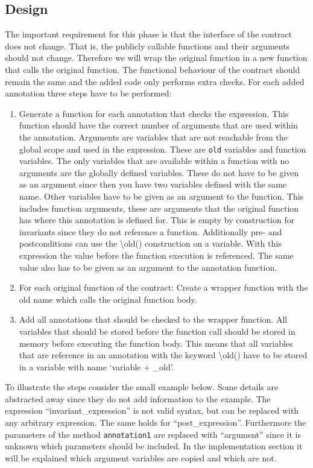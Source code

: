\documentclass[a4paper]{article}
\begin{document}
\subsection{Design}
The important requirement for this phase is that the interface of the contract does not change. That is, the publicly callable functions and their arguments should not change. Therefore we will wrap the original function in a new function that calls the original function. The functional behaviour of the contract should remain the same and the added code only performs extra checks. For each added annotation three steps have to be performed:
\begin{enumerate}
  \item Generate a function for each annotation that checks the expression. This function should have the correct number of arguments that are used within the annotation. Arguments are variables that are not reachable from the global scope and used in the expression. These are \texttt{old} variables and function variables. The only variables that are available within a function with no arguments are the globally defined variables. These do not have to be given as an argument since then you have two variables defined with the same name. Other variables have to be given as an argument to the function. This includes function arguments, these are arguments that the original function has where this annotation is defined for. This is empty by construction for invariants since they do not reference a function. Additionally pre- and postconditions can use the \textbackslash old() construction on a variable. With this expression the value before the function execution is referenced. The same value also has to be given as an argument to the annotation function.
  \item For each original function of the contract: Create a wrapper function with the old name which calls the original function body.
  \item Add all annotations that should be checked to the wrapper function. All variables that should be stored before the function call should be stored in memory before executing the function body. This means that all variables that are reference in an annotation with the keyword \textbackslash old() have to be stored in a variable with name `variable + \_old'.
\end{enumerate}
To illustrate the steps consider the small example below. Some details are abstracted away since they do not add information to the example. The expression ``invariant\_expression'' is not valid syntax, but can be replaced with any arbitrary expression. The same holds for ``post\_expression''. Furthermore the parameters of the method \texttt{annotation1} are replaced with ``argument'' since it is unknown which parameters should be included. In the implementation section it will be explained which argument variables are copied and which are not.
\end{document}
